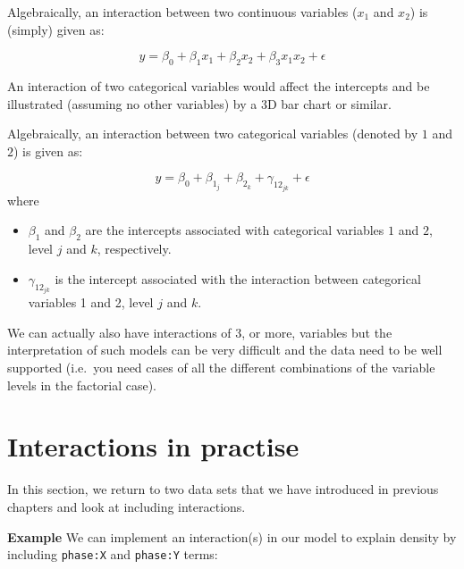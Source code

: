 \documentclass[
  oneside]{krantz}
\begin{document}
Algebraically, an interaction between two continuous variables (\(x_1\) and \(x_2\)) is (simply) given as:

\[y = \beta_0 + \beta_1 x_1 + \beta_2 x_2 + \beta_3 x_1x_2 + \epsilon\]

An interaction of two categorical variables would affect the intercepts and be illustrated (assuming no other variables) by a 3D bar chart or similar.

Algebraically, an interaction between two categorical variables (denoted by \(1\) and \(2\)) is given as:

\[y = \beta_0 + \beta_{1_j} + \beta_{2_k} + \gamma_{12_{jk}} + \epsilon\]
where

\begin{itemize}
\item
  \(\beta_1\) and \(\beta_2\) are the intercepts associated with categorical variables \(1\) and \(2\), level \(j\) and \(k\), respectively.
\item
  \(\gamma_{12_{jk}}\) is the intercept associated with the interaction between categorical variables 1 and 2, level \(j\) and \(k\).
\end{itemize}

We can actually also have interactions of 3, or more, variables but the interpretation of such models can be very difficult and the data need to be well supported (i.e.~you need cases of all the different combinations of the variable levels in the factorial case).

\hypertarget{interactions-in-practise}{%
\section{Interactions in practise}\label{interactions-in-practise}}

In this section, we return to two data sets that we have introduced in previous chapters and look at including interactions.

\textbf{Example} We can implement an interaction(s) in our model to explain density by including \texttt{phase:X} and \texttt{phase:Y} terms:

\scriptsize
\end{document}

